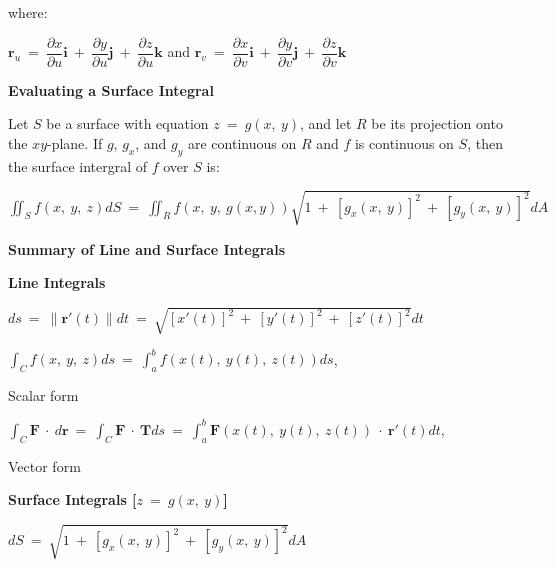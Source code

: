\documentclass{article}
\begin{document}
\begin{large}
\hspace{0.1in} where:

\vspace{-0.2in}
\hspace{1.0in} $\textbf{r}_{u}\ =\ \dfrac{\partial x}{\partial u}\textbf{i}\ +\ \dfrac{\partial y}{\partial u}\textbf{j}\ +\ \dfrac{\partial z}{\partial u}\textbf{k}$ and $\textbf{r}_{v}\ =\ \dfrac{\partial x}{\partial v}\textbf{i}\ +\ \dfrac{\partial y}{\partial v}\textbf{j}\ +\ \dfrac{\partial z}{\partial v}\textbf{k}$

\textbf{Evaluating a Surface Integral}

\hspace{0.1in} Let $S$ be a surface with equation $z\ =\ g(x,\ y)$, and let $R$ be its projection onto the $xy$-plane.  If $g$, $g_{x}$, and $g_{y}$ are continuous on $R$ and $f$ is continuous on $S$, then the surface intergral of $f$ over $S$ is:

\hspace{0.2in} $\displaystyle\iint_{S}f(x,\ y,\ z)dS\ =\ \displaystyle\iint_{R}f(x,\ y,\ g(x,y))\sqrt{1\ +\ [g_{x}(x,\ y)]^2\ +\ [g_{y}(x,\ y)]^{2}}dA$

\textbf{Summary of Line and Surface Integrals}

\hspace{0.1in} \textbf{Line Integrals}

\hspace{0.2in} $ds\ =\ \|\textbf{r}'(t)\|dt\ =\ \sqrt{[x'(t)]^{2}\ +\ [y'(t)]^{2}\ +\ [z'(t)]^{2}}dt$

\hspace{0.2in} $\displaystyle\int_{C}f(x,\ y,\ z)ds\ =\ \displaystyle\int^{b}_{a}f(x(t),\ y(t),\ z(t))ds$, \begin{Large} Scalar form \end{Large}

\hspace{0.2in} $\displaystyle\int_{C}\textbf{F}\ \cdot\ d\textbf{r}\ =\ \displaystyle\int_{C}\textbf{F}\ \cdot\ \textbf{T}ds\ =\ \displaystyle\int^{b}_{a}\textbf{F}(x(t),\ y(t),\ z(t))\ \cdot\ \textbf{r}'(t)dt$, \begin{Large} Vector form \end{Large}

\hspace{0.1in} \textbf{Surface Integrals [$z\ =\ g(x,\ y)$]}

\hspace{0.2in} $dS\ =\ \sqrt{1\ +\ [g_{x}(x,\ y)]^{2}\ +\ [g_{y}(x,\ y)]^{2}}dA$


\end{large}
\end{document}
